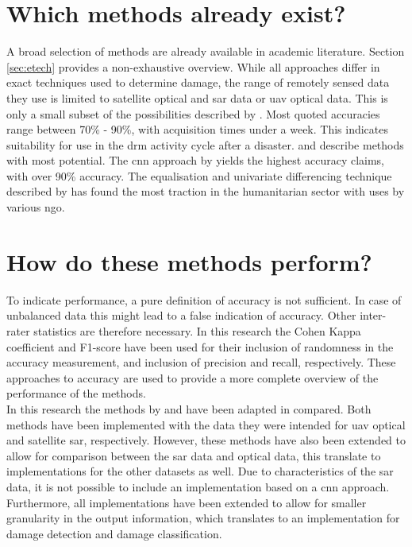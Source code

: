 \section{Which methods already exist?}
A broad selection of methods are already available in academic literature. Section \ref{sec:etech} provides a non-exhaustive overview. While all approaches differ in exact techniques used to determine damage, the range of remotely sensed data they use is limited to satellite optical and \ac{sar} data or \ac{uav} optical data. This is only a small subset of the possibilities described by \citet{Kerle2008}. Most quoted accuracies range between 70\% - 90\%, with acquisition times under a week. This indicates suitability for use in the \ac{drm} activity cycle after a disaster. \citet{Vetrivel2016b} and \citet{Yun2015} describe methods with most potential. The \ac{cnn} approach by \cite{Vetrivel2016b} yields the highest accuracy claims, with over 90\% accuracy. The equalisation and univariate differencing technique described by \cite{Yun2015} has found the most traction in the humanitarian sector with uses by various \ac{ngo}.

\section{How do these methods perform?}
To indicate performance, a pure definition of accuracy is not sufficient. In case of unbalanced data this might lead to a false indication of accuracy. Other inter-rater statistics are therefore necessary. In this research the Cohen Kappa coefficient and F1-score have been used for their inclusion of randomness in the accuracy measurement, and inclusion of precision and recall, respectively. These approaches to accuracy are used to provide a more complete overview of the performance of the methods. \\

\noindent In this research the methods by \citet{Vetrivel2016b} and \citet{Yun2015} have been adapted in compared. Both methods have been implemented with the data they were intended for \ac{uav} optical and satellite \ac{sar}, respectively. However, these methods have also been extended to allow for comparison between the \ac{sar} data and optical data, this translate to implementations for the other datasets as well. Due to characteristics of the \ac{sar} data, it is not possible to include an implementation based on a \ac{cnn} approach. Furthermore, all implementations have been extended to allow for smaller granularity in the output information, which translates to an implementation for damage detection and damage classification.\\

